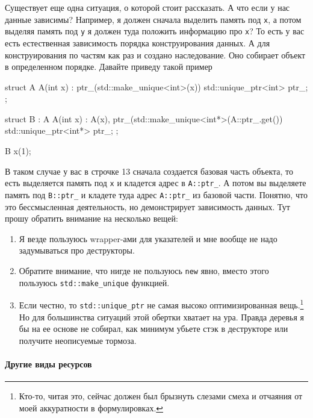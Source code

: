 Существует еще одна ситуация, о которой стоит рассказать.
А что если у нас данные зависимы?
Например, я должен сначала выделить память под \verb"x", а потом выделяя память под \verb"y" я должен туда положить информацию про \verb"x"?
То есть у вас есть естественная зависимость порядка конструирования данных.
А для конструирования по частям как раз и создано наследование.
Оно собирает объект в определенном порядке.
Давайте приведу такой пример
\begin{cppcode}
struct A {
  A(int x) : ptr_(std::make_unique<int>(x)) {}
  std::unique_ptr<int> ptr_;
};

struct B : A {
  A(int x)
   : A(x),
     ptr_(std::make_unique<int*>(A::ptr_.get()) {}
   std::unique_ptr<int*> ptr_;
};

B x(1);
\end{cppcode}
В таком случае у вас в строчке 13 сначала создается базовая часть объекта, то есть выделяется память под \verb"x" и кладется адрес в \verb"A::ptr_".
А потом вы выделяете память под \verb"B::ptr_" и кладете туда адрес \verb"A::ptr_" из базовой части.
Понятно, что это бессмысленная деятельность, но демонстрирует зависимость данных.
Тут прошу обратить внимание на несколько вещей:
\begin{enumerate}
\item Я везде пользуюсь wrapper-ами для указателей и мне вообще не надо задумываться про деструкторы.
\item Обратите внимание, что нигде не пользуюсь \verb"new" явно, вместо этого пользуюсь \verb"std::make_unique" функцией.
\item Если честно, то \verb"std::unique_ptr" не самая высоко оптимизированная вещь.\footnote{Кто-то, читая это, сейчас должен был брызнуть слезами смеха и отчаяния от моей аккуратности в формулировках.} Но для большинства ситуаций этой обертки хватает на ура.
Правда деревья я бы на ее основе не собирал, как минимум убьете стэк в деструкторе или получите неописуемые тормоза.
\end{enumerate}

\paragraph{Другие виды ресурсов}


